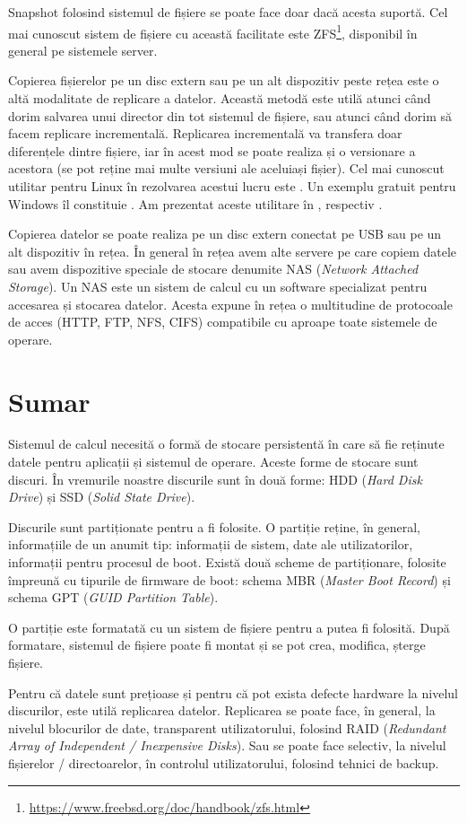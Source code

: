 Snapshot folosind sistemul de fișiere se poate face doar dacă acesta suportă.
 Cel mai cunoscut sistem de fișiere cu această facilitate este ZFS\footnote{\url{https://www.freebsd.org/doc/handbook/zfs.html}}, disponibil în general pe sistemele server.

Copierea fișierelor pe un disc extern sau pe un alt dispozitiv peste rețea este o altă modalitate de replicare a datelor.
Această metodă este utilă atunci când dorim salvarea unui director din tot sistemul de fișiere, sau atunci când dorim să facem replicare incrementală.
Replicarea incrementală va transfera doar diferențele dintre fișiere, iar în acest mod se poate realiza și o versionare a acestora (se pot reține mai multe versiuni ale aceluiași fișier).
Cel mai cunoscut utilitar pentru Linux în rezolvarea acestui lucru este .
Un exemplu gratuit pentru Windows îl constituie .
Am prezentat aceste utilitare în , respectiv .

Copierea datelor se poate realiza pe un disc extern conectat pe USB sau pe un alt dispozitiv în rețea.
În general în rețea avem alte servere pe care copiem datele sau avem dispozitive speciale de stocare denumite NAS  (\textit{Network Attached Storage}).
Un NAS este un sistem de calcul cu un software specializat pentru accesarea și stocarea datelor.
Acesta expune în rețea o multitudine de protocoale de acces (HTTP, FTP, NFS, CIFS) compatibile cu aproape toate sistemele de operare.

\section{Sumar}
\label{sec:storage:summary}

Sistemul de calcul necesită o formă de stocare persistentă în care să fie reținute datele pentru aplicații și sistemul de operare.
Aceste forme de stocare sunt discuri.
În vremurile noastre discurile sunt în două forme: HDD (\textit{Hard Disk Drive}) și SSD (\textit{Solid State Drive}).

Discurile sunt partiționate pentru a fi folosite.
O partiție reține, în general, informațiile de un anumit tip: informații de sistem, date ale utilizatorilor, informații pentru procesul de boot.
Există două scheme de partiționare, folosite împreună cu tipurile de firmware de boot: schema MBR (\textit{Master Boot Record}) și schema GPT (\textit{GUID Partition Table}).

O partiție este formatată cu un sistem de fișiere pentru a putea fi folosită.
După formatare, sistemul de fișiere poate fi montat și se pot crea, modifica, șterge fișiere.

Pentru că datele sunt prețioase și pentru că pot exista defecte hardware la nivelul discurilor, este utilă replicarea datelor.
Replicarea se poate face, în general, la nivelul blocurilor de date, transparent utilizatorului, folosind RAID (\textit{Redundant Array of Independent / Inexpensive Disks}).
Sau se poate face selectiv, la nivelul fișierelor / directoarelor, în controlul utilizatorului, folosind tehnici de backup.
